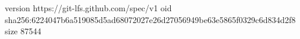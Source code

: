version https://git-lfs.github.com/spec/v1
oid sha256:6224047b6a519085d5ad68072027e26d27056949be63e5865f0329c6d834d2f8
size 87544
